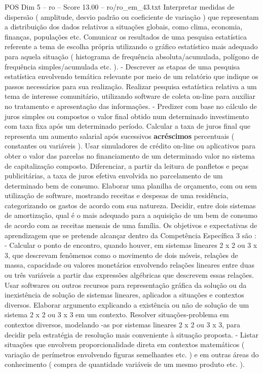 \begin{textsample}{POS Dim 5 – ro – Score 13.00 – ro/ro\_em\_43.txt}
Interpretar medidas de dispersão ( amplitude, desvio padrão ou coeficiente de variação ) que representam a distribuição dos dados relativos a situações globais, como clima, economia, finanças, populações etc.
Comunicar os resultados de uma pesquisa estatística referente a tema de escolha própria utilizando o gráfico estatístico mais adequado para aquela situação ( histograma de frequência absoluta/acumulada, polígono de frequência simples/acumulada etc. ). - Descrever as etapas de uma pesquisa estatística envolvendo temática relevante por meio de um relatório que indique os passos necessários para sua realização.
Realizar pesquisa estatística relativa a um tema de interesse comunitário, utilizando software de coleta on-line para auxiliar no tratamento e apresentação das informações. - Predizer com base no cálculo de juros simples ou compostos o valor final obtido num determinado investimento com taxa fixa após um determinado período.
Calcular a taxa de juros final que representa um aumento salarial após sucessivos \textbf{acréscimos} percentuais ( constantes ou variáveis ).
Usar simuladores de crédito on-line ou aplicativos para obter o valor das parcelas no financiamento de um determinado valor no sistema de capitalização composto.
Diferenciar, a partir da leitura de panfletos e peças publicitárias, a taxa de juros efetiva envolvida no parcelamento de um determinado bem de consumo.
Elaborar uma planilha de orçamento, com ou sem utilização de software, mostrando receitas e despesas de uma residência, categorizando os gastos de acordo com sua natureza.
Decidir, entre dois sistemas de amortização, qual é o mais adequado para a aquisição de um bem de consumo de acordo com as receitas mensais de uma família.
Os objetivos e expectativas de aprendizagem que se pretende alcançar dentro da Competência Específica 3 são : - Calcular o ponto de encontro, quando houver, em sistemas lineares 2 x 2 ou 3 x 3, que descrevam fenômenos como o movimento de dois móveis, relações de massa, capacidade ou valores monetários envolvendo relações lineares entre duas ou três variáveis a partir das expressões algébricas que descrevem essas relações.
Usar softwares ou outros recursos para representação gráfica da solução ou da inexistência de solução de sistemas lineares, aplicados a situações e contextos diversos.
Elaborar argumento explicando a existência ou não de solução de um sistema 2 x 2 ou 3 x 3 em um contexto.
Resolver situações-problema em contextos diversos, modelando -as por sistemas lineares 2 x 2 ou 3 x 3, para decidir pela estratégia de resolução mais conveniente à situação proposta. - Listar situações que envolvem proporcionalidade direta em contextos matemáticos ( variação de perímetros envolvendo figuras semelhantes etc. ) e em outras áreas do conhecimento ( compra de quantidade variáveis de um mesmo produto etc. ).

\end{textsample}
